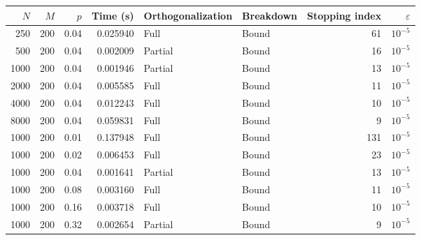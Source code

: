 \begin{tabular}{rrrrllrr}
\toprule
$N$ & $M$ & $p$ & Time (s)& Orthogonalization & Breakdown & Stopping index & $\varepsilon $ \\
\midrule
250 & 200 & 0.04 & 0.025940 & Full & Bound & 61 & $10^{-5}$  \\
500 & 200 & 0.04 & 0.002009 & Partial & Bound & 16 & $10^{-5}$ \\
1000 & 200 & 0.04 & 0.001946 & Partial & Bound & 13 & $10^{-5}$ \\
2000 & 200 & 0.04 & 0.005585 & Full & Bound & 11 & $10^{-5}$ \\
4000 & 200 & 0.04 & 0.012243 & Full & Bound & 10 & $10^{-5}$ \\
8000 & 200 & 0.04 & 0.059831 & Full & Bound & 9 & $10^{-5}$  \\
\midrule
1000 & 200 & 0.01 & 0.137948 & Full & Bound & 131 & $10^{-5}$ \\
1000 & 200 & 0.02 & 0.006453 & Full & Bound & 23 & $10^{-5}$  \\
1000 & 200 & 0.04 & 0.001641 & Partial & Bound & 13 & $10^{-5}$  \\
1000 & 200 & 0.08 & 0.003160 & Full & Bound & 11 & $10^{-5}$  \\
1000 & 200 & 0.16 & 0.003718 & Full & Bound & 10 & $10^{-5}$  \\
1000 & 200 & 0.32 & 0.002654 & Partial & Bound & 9 & $10^{-5}$  \\
\bottomrule
\end{tabular}
